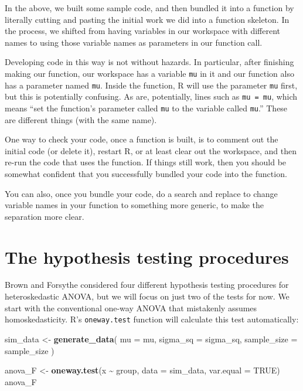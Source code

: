 \documentclass[
]{book}
\newenvironment{Shaded}{\begin{snugshade}}{\end{snugshade}}
\newcommand{\AttributeTok}[1]{\textcolor[rgb]{0.13,0.29,0.53}{#1}}
\newcommand{\ConstantTok}[1]{\textcolor[rgb]{0.56,0.35,0.01}{#1}}
\newcommand{\FunctionTok}[1]{\textcolor[rgb]{0.13,0.29,0.53}{\textbf{#1}}}
\newcommand{\NormalTok}[1]{#1}
\newcommand{\OtherTok}[1]{\textcolor[rgb]{0.56,0.35,0.01}{#1}}
\newcommand{\SpecialCharTok}[1]{\textcolor[rgb]{0.81,0.36,0.00}{\textbf{#1}}}
\begin{document}
In the above, we built some sample code, and then bundled it into a function by literally cutting and pasting the initial work we did into a function skeleton.
In the process, we shifted from having variables in our workspace with different names to using those variable names as parameters in our function call.

Developing code in this way is not without hazards.
In particular, after finishing making our function, our workspace has a variable \texttt{mu} in it and our function also has a parameter named \texttt{mu}.
Inside the function, R will use the parameter \texttt{mu} first, but this is potentially confusing.
As are, potentially, lines such as \texttt{mu\ =\ mu}, which means ``set the function's parameter called \texttt{mu} to the variable called \texttt{mu}.''
These are different things (with the same name).

One way to check your code, once a function is built, is to comment out the initial code (or delete it), restart R, or at least clear out the workspace, and then re-run the code that uses the function.
If things still work, then you should be somewhat confident that you successfully bundled your code into the function.

You can also, once you bundle your code, do a search and replace to change variable names in your function to something more generic, to make the separation more clear.

\section{The hypothesis testing procedures}\label{the-hypothesis-testing-procedures}

Brown and Forsythe considered four different hypothesis testing procedures for heteroskedastic ANOVA, but we will focus on just two of the tests for now.
We start with the conventional one-way ANOVA that mistakenly assumes homoskedasticity.
R's \texttt{oneway.test} function will calculate this test automatically:

\begin{Shaded}
\begin{Highlighting}[]
\NormalTok{sim\_data }\OtherTok{\textless{}{-}} \FunctionTok{generate\_data}\NormalTok{(}
  \AttributeTok{mu =}\NormalTok{ mu, }
  \AttributeTok{sigma\_sq =}\NormalTok{ sigma\_sq,}
  \AttributeTok{sample\_size =}\NormalTok{ sample\_size}
\NormalTok{)}

\NormalTok{anova\_F }\OtherTok{\textless{}{-}} \FunctionTok{oneway.test}\NormalTok{(x }\SpecialCharTok{\textasciitilde{}}\NormalTok{ group, }\AttributeTok{data =}\NormalTok{ sim\_data, }\AttributeTok{var.equal =} \ConstantTok{TRUE}\NormalTok{)}
\NormalTok{anova\_F}
\end{Highlighting}
\end{Shaded}
\end{document}
